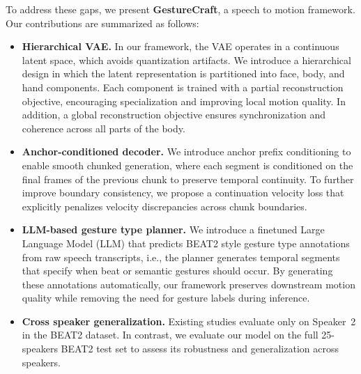 To address these gaps, we present \textbf{GestureCraft}, a speech to motion framework.
Our contributions are summarized as follows:

\begin{itemize}[leftmargin=*]
    \item \textbf{Hierarchical VAE.} In our framework, the VAE operates in a continuous latent space, which avoids quantization artifacts. We introduce a hierarchical design in which the latent representation is partitioned into face, body, and hand components. Each component is trained with a partial reconstruction objective, encouraging specialization and improving local motion quality. In addition, a global reconstruction objective ensures synchronization and coherence across all parts of the body.
    \item \textbf{Anchor-conditioned decoder.} We introduce anchor prefix conditioning to enable smooth chunked generation, where each segment is conditioned on the final frames of the previous chunk to preserve temporal continuity. To further improve boundary consistency, we propose a continuation velocity loss that explicitly penalizes velocity discrepancies across chunk boundaries.
    \item \textbf{LLM-based gesture type planner.}
    We introduce a finetuned Large Language Model (LLM) that predicts BEAT2 style gesture type annotations from raw speech transcripts, i.e., the planner generates temporal segments that specify when beat or semantic gestures should occur. By generating these annotations automatically, our framework preserves downstream motion quality while removing the need for gesture labels during inference.
    \item \textbf{Cross speaker generalization.} Existing studies evaluate only on Speaker~2 in the BEAT2 dataset. In contrast, we evaluate our model on the full 25-speakers BEAT2 test set to assess its robustness and generalization across speakers.
\end{itemize}


